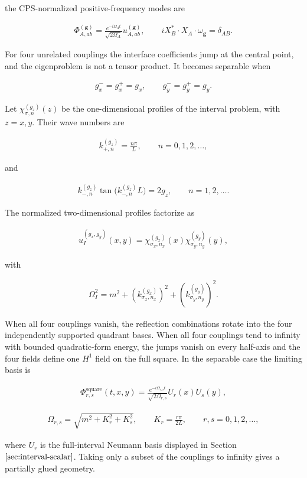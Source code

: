 the CPS-normalized positive-frequency modes are

\begin{align}
\Phi_{A,ab}^{(\boldsymbol g)}
=\frac{e^{-i\Omega_At}}{\sqrt{2\Omega_A}}
u_{A,ab}^{(\boldsymbol g)},
\qquad
iX_B^*\mathbin{\cdot}X_A\mathbin{\cdot}\omega_{\boldsymbol g}
=\delta_{AB}.
\end{align}

For four unrelated couplings the interface coefficients jump at the central point, and the eigenproblem is not a tensor product. It becomes separable when

\begin{align}
g_x^-=g_x^+=g_x,
\qquad
g_y^-=g_y^+=g_y.
\end{align}

Let $\chi_{\sigma,n}^{(g_z)}(z)$ be the one-dimensional profiles of the interval problem, with $z=x,y$. Their wave numbers are

\begin{align}
k_{+,n}^{(g_z)}=\frac{n\pi}{L},
\qquad
n=0,1,2,\ldots,
\end{align}

and

\begin{align}
k_{-,n}^{(g_z)}\tan\bigl(k_{-,n}^{(g_z)}L\bigr)=2g_z,
\qquad
n=1,2,\ldots.
\end{align}

The normalized two-dimensional profiles factorize as

\begin{align}
u_I^{(g_x,g_y)}(x,y)
=\chi_{\sigma_x,n_x}^{(g_x)}(x)
\chi_{\sigma_y,n_y}^{(g_y)}(y),
\end{align}

with

\begin{align}
\Omega_I^2
=m^2+\left(k_{\sigma_x,n_x}^{(g_x)}\right)^2
+\left(k_{\sigma_y,n_y}^{(g_y)}\right)^2.
\end{align}

When all four couplings vanish, the reflection combinations rotate into the four independently supported quadrant bases. When all four couplings tend to infinity with bounded quadratic-form energy, the jumps vanish on every half-axis and the four fields define one $H^1$ field on the full square. In the separable case the limiting basis is

\begin{align}
\Phi_{r,s}^{\mathrm{square}}(t,x,y)
=\frac{e^{-i\Omega_{r,s}t}}{\sqrt{2\Omega_{r,s}}}
U_r(x)U_s(y),
\end{align}

\begin{align}
\Omega_{r,s}
=\sqrt{m^2+K_r^2+K_s^2},
\qquad
K_r=\frac{r\pi}{2L},
\qquad
r,s=0,1,2,\ldots,
\end{align}

where $U_r$ is the full-interval Neumann basis displayed in Section $\ref{sec:interval-scalar}$. Taking only a subset of the couplings to infinity gives a partially glued geometry.
